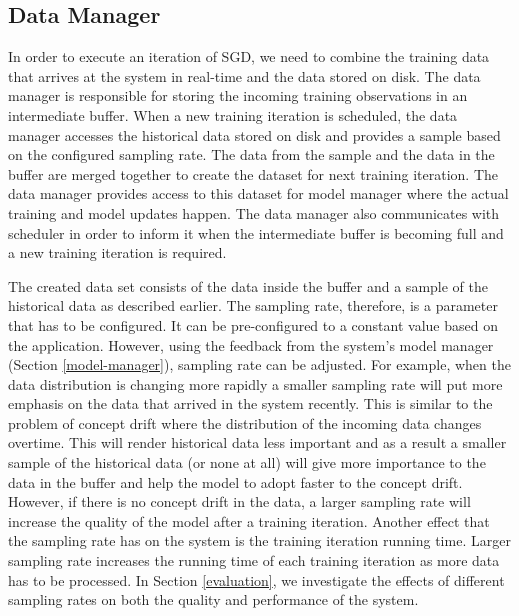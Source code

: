 \documentclass{sig-alternate-05-2015}
\begin{document}
\subsection{Data Manager} \label{data-manager}
In order to execute an iteration of SGD, we need to combine the training data that arrives at the system in real-time and the data stored on disk.
The data manager is responsible for storing the incoming training observations in an intermediate buffer.
When a new training iteration is scheduled, the data manager accesses the historical data stored on disk and provides a sample based on the configured sampling rate.
The data from the sample and the data in the buffer are merged together to create the dataset for next training iteration.
The data manager provides access to this dataset for model manager where the actual training and model updates happen.
The data manager also communicates with scheduler in order to inform it when the intermediate buffer is becoming full and a new training iteration is required. 

The created data set consists of the data inside the buffer and a sample of the historical data as described earlier.
The sampling rate, therefore, is a parameter that has to be configured.
It can be pre-configured to a constant value based on the application.
However, using the feedback from the system's model manager (Section \ref{model-manager}), sampling rate can be adjusted.
For example, when the data distribution is changing more rapidly a smaller sampling rate will put more emphasis on the data that arrived in the system recently. 
This is similar to the problem of concept drift where the distribution of the incoming data changes overtime.
This will render historical data less important and as a result a smaller sample of the historical data (or none at all) will give more importance to the data in the buffer and help the model to adopt faster to the concept drift.
However, if there is no concept drift in the data, a larger sampling rate will increase the quality of the model after a training iteration.
Another effect that the sampling rate has on the system is the training iteration running time.
Larger sampling rate increases the running time of each training iteration as more data has to be processed.
In Section \ref{evaluation}, we investigate the effects of different sampling rates on both the quality and performance of the system.
\end{document}
